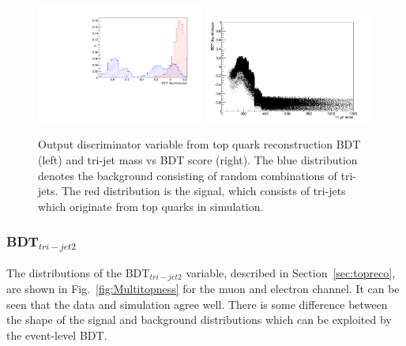 \begin{figure}[!ht]
\centering
    \includegraphics[width=0.49\textwidth]{images/Run1/BDT_Disc.pdf}
    \includegraphics[width=0.49\textwidth]{images/Run1/TrijetmassVsBDT.png}
    \caption{Output discriminator variable from top quark reconstruction BDT (left) and tri-jet mass vs BDT score (right). The blue distribution denotes the background consisting of random combinations of tri-jets. The red distribution is the signal, which consists of tri-jets which originate from top quarks in simulation.}
    \label{fig:TopBDToutput}
\end{figure}

\subsubsection*{BDT$_{tri-jet2}$}
The distributions of the BDT$_{tri-jet2}$ variable, described in Section~\ref{sec:topreco}, are shown in Fig.~\ref{fig:Multitopness} for the muon and electron channel. It can be seen that the data and simulation agree well. There is some difference between the shape of the signal and background distributions which can be exploited by the event-level BDT.

